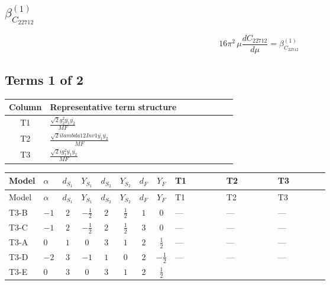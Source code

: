 \documentclass[8pt]{article}
\begin{document}
\begin{landscape}
\section*{$\beta_{C_{22712}}^{(1)}$}
\[16\pi^2\,\mu\frac{d C_{22712}}{d\mu}=\beta_{C_{22712}}^{(1)}\]
\subsection*{Terms 1 of 2}
\begin{center}
\begin{tabular}{@{}c >{\raggedright\arraybackslash}p{0.82\linewidth}@{}}
\toprule
Column & Representative term structure \\
\midrule
T1 & \(\displaystyle \frac{\sqrt{2} g_{2}^{2} \overline{y_{1}} \overline{y_{2}}}{MF}\) \\
\midrule
T2 & \(\displaystyle \frac{\sqrt{2} i lambda12Inv1 \overline{y_{1}} \overline{y_{2}}}{MF}\) \\
\midrule
T3 & \(\displaystyle \frac{\sqrt{2} i g_{1}^{2} \overline{y_{1}} \overline{y_{2}}}{MF}\) \\
\midrule
\bottomrule
\end{tabular}
\end{center}
\smallskip
\tiny
\begin{longtable}{@{}llcccccc >{\raggedright\arraybackslash}p{0.21\linewidth} >{\raggedright\arraybackslash}p{0.21\linewidth} >{\raggedright\arraybackslash}p{0.21\linewidth}@{}}
\toprule
Model & $\alpha$ & $d_{S_1}$ & $Y_{S_1}$ & $d_{S_2}$ & $Y_{S_2}$ & $d_F$ & $Y_F$ & T1 & T2 & T3 \\
\midrule
\endfirsthead
\toprule
Model & $\alpha$ & $d_{S_1}$ & $Y_{S_1}$ & $d_{S_2}$ & $Y_{S_2}$ & $d_F$ & $Y_F$ & T1 & T2 & T3 \\
\midrule
\endhead
T3-B & $-1$ & $2$ & $-\frac{1}{2}$ & $2$ & $\frac{1}{2}$ & $1$ & $0$ & --- & --- & --- \\
\midrule
T3-C & $-1$ & $2$ & $-\frac{1}{2}$ & $2$ & $\frac{1}{2}$ & $3$ & $0$ & --- & --- & --- \\
\midrule
T3-A & $0$ & $1$ & $0$ & $3$ & $1$ & $2$ & $\frac{1}{2}$ & --- & --- & --- \\
\midrule
T3-D & $-2$ & $3$ & $-1$ & $1$ & $0$ & $2$ & $-\frac{1}{2}$ & --- & --- & --- \\
\midrule
T3-E & $0$ & $3$ & $0$ & $3$ & $1$ & $2$ & $\frac{1}{2}$ & \scriptsize\adjustbox{max width=\linewidth}{$\begin{gathered} \frac{\sqrt{2} g_{2}^{2} \overline{y_{1}} \overline{y_{2}}}{4 MF}\end{gathered}$} & \scriptsize\adjustbox{max width=\linewidth}{$\begin{gathered} - \frac{\sqrt{2} i lambda12Inv1 \overline{y_{1}} \overline{y_{2}}}{4 MF}\end{gathered}$} & \scriptsize\adjustbox{max width=\linewidth}{$\begin{gathered} \frac{3 \sqrt{2} i g_{1}^{2} \overline{y_{1}} \overline{y_{2}}}{16 MF}\end{gathered}$} \\
\midrule
\bottomrule
\end{longtable}
\clearpage

\end{landscape}
\end{document}
